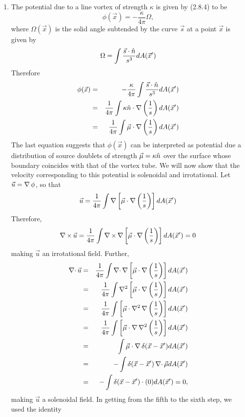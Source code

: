 \begin{enumerate}
\item The potential due to a line vortex of strength $\kappa$ is given by (2.8.4) to be
\[
\phi(\vec{x}) = -\frac{\kappa}{4\pi}\Omega,
\]
where $\Omega(\vec{x})$ is the solid angle subtended by the curve $\vec{s}$ at a point $\vec{x}$ is given by
\[
\Omega = \int\frac{\vec{s}\cdot\hat{n}}{s^3}dA(\vec{x}^{\prime}) 
\]
Therefore
\begin{eqnarray*}
\phi(\vec{x}) &=& -\frac{\kappa}{4\pi}\int\frac{\vec{s}\cdot\hat{n}}{s^3}dA(\vec{x}^{\prime})	\\
 &=& \frac{1}{4\pi}\int\kappa\hat{n}\cdot\operatorname{\nabla}\left(\frac{1}{s}\right)dA(\vec{x}^{\prime})	\\
 &=& \frac{1}{4\pi}\int\vec{\mu}\cdot\operatorname{\nabla}\left(\frac{1}{s}\right)dA(\vec{x}^{\prime})
\end{eqnarray*}
The last equation suggests that $\phi(\vec{x})$ can be interpreted as potential due a distribution of source doublets of strength $\vec{\mu} = \kappa\hat{n}$ over the surface whose boundary 
coincides with that of the vortex tube. We will now show that the velocity corresponding to this potential is solenoidal and irrotational. Let $\vec{u} = \operatorname{\nabla}\phi$, so that
\[
\vec{u} = \frac{1}{4\pi}\int\operatorname{\nabla}\left[\vec{\mu}\cdot\operatorname{\nabla}\left(\frac{1}{s}\right)\right]dA(\vec{x}^{\prime})
\]
Therefore,
\[
\operatorname{\nabla\operatorname{\times}}\vec{u} = \frac{1}{4\pi}\int\operatorname{\nabla\operatorname{\times}}\operatorname{\nabla}\left[\vec{\mu}\cdot\operatorname{\nabla}\left(\frac{1}{s}\right)\right]dA(\vec{x}^{\prime}) = 0
\]
making $\vec{u}$ an irrotational field. Further,
\begin{eqnarray*}
\operatorname{\nabla\cdot}\vec{u} &=&  \frac{1}{4\pi}\int\operatorname{\nabla\cdot}\operatorname{\nabla}\left[\vec{\mu}\cdot\operatorname{\nabla}\left(\frac{1}{s}\right)\right]dA(\vec{x}^{\prime}) \\
 &=& \frac{1}{4\pi}\int\nabla^2\left[\vec{\mu}\cdot\operatorname{\nabla}\left(\frac{1}{s}\right)\right]dA(\vec{x}^{\prime}) \\
 &=& \frac{1}{4\pi}\int\left[\vec{\mu}\cdot\nabla^2\operatorname{\nabla}\left(\frac{1}{s}\right)\right]dA(\vec{x}^{\prime}) \\
 &=& \frac{1}{4\pi}\int\left[\vec{\mu}\cdot\operatorname{\nabla}\nabla^2\left(\frac{1}{s}\right)\right]dA(\vec{x}^{\prime}) \\
 &=& \int\vec{\mu}\cdot\operatorname{\nabla}\delta(\vec{x} - \vec{x}^\prime) dA(\vec{x}^{\prime}) \\
 &=& -\int\delta(\vec{x} - \vec{x}^\prime)\operatorname{\nabla\cdot}\vec{\mu} dA(\vec{x}^{\prime}) \\
 &=& -\int\delta(\vec{x} - \vec{x}^\prime)\cdot(0) dA(\vec{x}^{\prime}) = 0,
\end{eqnarray*}
making $\vec{u}$ a solenoidal field. In getting from the fifth to the sixth step, we used the identity

\end{enumerate}
